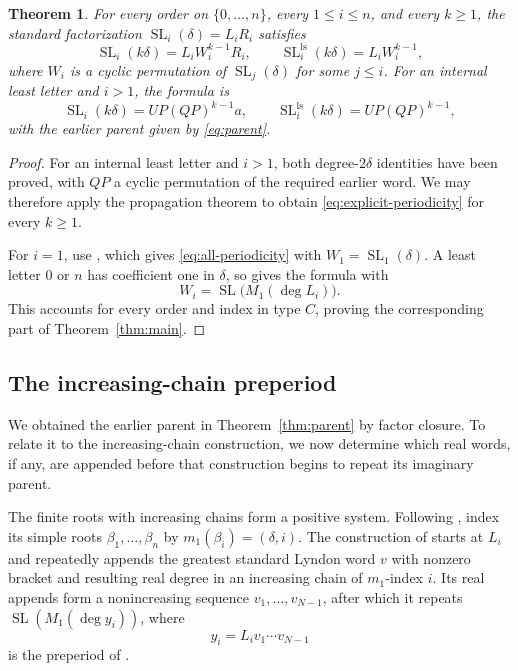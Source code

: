 \documentclass[11pt]{amsart}
\numberwithin{equation}{section}
\newtheorem{theorem}{Theorem}[section]
\theoremstyle{definition}
\DeclareMathOperator{\SL}{SL}
\newcommand{\ls}{\mathrm{ls}}
\begin{document}
\begin{theorem}\label{thm:periodicity}
For every order on $\{0,\ldots,n\}$, every $1\leq i\leq n$, and every $k\geq1$, the standard factorization $\SL_i(\delta)=L_iR_i$ satisfies
\begin{equation}\label{eq:all-periodicity}
 \SL_i(k\delta)=L_iW_i^{k-1}R_i,
 \qquad
 \SL_i^{\ls}(k\delta)=L_iW_i^{k-1},
\end{equation}
where $W_i$ is a cyclic permutation of $\SL_j(\delta)$ for some $j\leq i$. For an internal least letter and $i>1$, the formula is
\begin{equation}\label{eq:explicit-periodicity}
 \SL_i(k\delta)=UP(QP)^{k-1}a,
 \qquad
 \SL_i^{\ls}(k\delta)=UP(QP)^{k-1},
\end{equation}
with the earlier parent given by \eqref{eq:parent}.
\end{theorem}
\begin{proof}
For an internal least letter and $i>1$, both degree-$2\delta$ identities have been proved, with $QP$ a cyclic permutation of the required earlier word. We may therefore apply the propagation theorem \cite[Proposition~6.32]{ET} to obtain \eqref{eq:explicit-periodicity} for every $k\geq1$.

For $i=1$, use \cite[Proposition~6.25]{ET}, which gives \eqref{eq:all-periodicity} with $W_1=\SL_1(\delta)$. A least letter $0$ or $n$ has coefficient one in $\delta$, so \cite[Theorem~6.14]{ET} gives the formula with
\[
 W_i=\SL\bigl(M_1(\deg L_i)\bigr).
\]
This accounts for every order and index in type $C$, proving the corresponding part of Theorem~\ref{thm:main}.
\end{proof}

\subsection{The increasing-chain preperiod}\label{subsec:preperiod}

We obtained the earlier parent in Theorem~\ref{thm:parent} by factor closure. To relate it to the increasing-chain construction, we now determine which real words, if any, are appended before that construction begins to repeat its imaginary parent.

The finite roots with increasing chains form a positive system. Following \cite[Section~4]{ETC}, index its simple roots $\beta_1,\ldots,\beta_n$ by $m_1(\beta_i)=(\delta,i)$. The construction of \cite[Lemma~6.9]{ETC} starts at $L_i$ and repeatedly appends the greatest standard Lyndon word $v$ with nonzero bracket and resulting real degree in an increasing chain of $m_1$-index $i$. Its real appends form a nonincreasing sequence $v_1,\ldots,v_{N-1}$, after which it repeats $\SL(M_1(\deg y_i))$, where
\[
 y_i=L_iv_1\cdots v_{N-1}
\]
is the preperiod of \cite[Definition~6.10]{ETC}.
\end{document}
